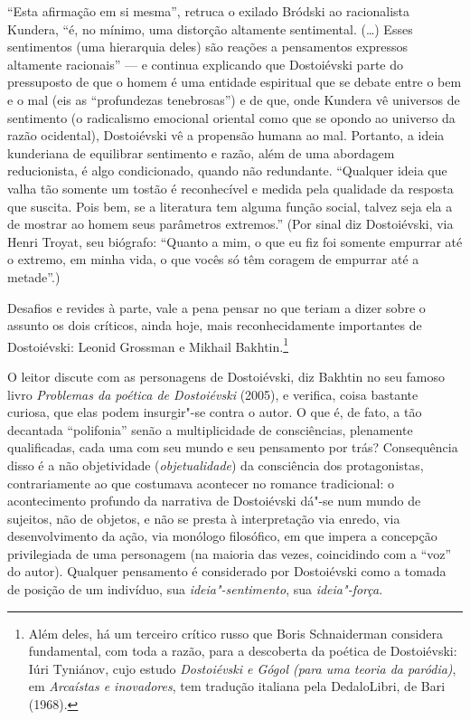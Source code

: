 ``Esta afirmação em si mesma'', retruca o exilado Bródski ao
racionalista Kundera, ``é, no mínimo, uma distorção altamente
sentimental. (\ldots{}) Esses sentimentos (uma hierarquia deles) são reações
a pensamentos expressos altamente racionais'' --- e continua explicando
que Dostoiévski parte do pressuposto de que o homem é uma entidade
espiritual que se debate entre o bem e o mal (eis as ``profundezas
tenebrosas'') e de que, onde Kundera vê universos de sentimento (o
radicalismo emocional oriental como que se opondo ao universo da razão
ocidental), Dostoiévski vê a propensão humana ao mal. Portanto, a ideia
kunderiana de equilibrar sentimento e razão, além de uma abordagem
reducionista, é algo condi­cionado, quando não redundante. ``Qualquer
ideia que valha tão somente um tostão é reconhecível e medida pela
qualidade da resposta que suscita. Pois bem, se a literatura tem alguma
função social, talvez seja ela a de mostrar ao homem seus parâmetros
extremos.'' (Por sinal diz Dostoiévski, via Henri Troyat, seu biógrafo:
``Quanto a mim, o que eu fiz foi somente empurrar até o extremo, em
minha vida, o que vocês só têm coragem de empurrar até a metade''.)


Desafios e revides à parte, vale a pena pensar no que teriam a dizer
sobre o assunto os dois críticos, ainda hoje, mais reconhecidamente
importantes de Dostoiévski: Leonid Grossman e Mikhail Bakhtin.\footnote{Além
deles, há um terceiro crítico russo que Boris Schnaiderman considera
fundamental, com toda a razão, para a descoberta da poética de
Dostoiévski: Iúri Tyniánov, cujo estudo \emph{Dostoiévski e Gógol
(para uma teoria da paródia)}, em \emph{Arcaístas e inovadores},
tem tradução italiana pela DedaloLibri, de Bari (1968).}

O leitor discute com as personagens de Dostoiévski, diz Bakhtin no seu
famoso livro \emph{Problemas da poética de Dostoiévski} (2005), e
verifica, coisa bastante curiosa, que elas podem insurgir"-se contra o
autor. O que é, de fato, a tão decantada ``polifonia'' senão a
multiplicidade de consciências, plena­mente qualificadas, cada uma com
seu mundo e seu pensamento por trás? Consequência disso é a não
objetividade (\emph{objetualidade}) da consciência dos protagonistas,
contrariamente ao que costumava acontecer no romance tradicional: o
acontecimento profundo da narrativa de Dostoiévski dá"-se num mundo de
sujeitos, não de objetos, e não se presta à interpre­tação via enredo,
via desenvolvimento da ação, via monólogo filosófico, em que impera a
concepção privilegiada de uma personagem (na maioria das vezes,
coincidindo com a ``voz'' do autor). Qualquer pensamento é considerado
por Dostoiévski como a tomada de posição de um indivíduo, sua
\emph{ideia"-sentimento}, sua \emph{ideia"-força}.


